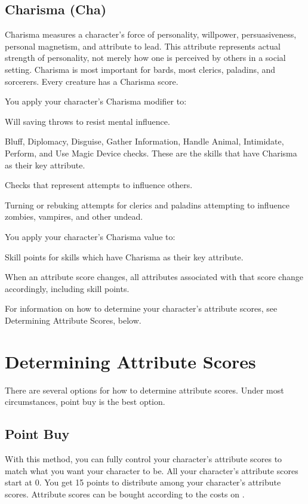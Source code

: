 \subsection{Charisma (Cha)}
Charisma measures a character's force of personality, willpower, persuasiveness, personal magnetism, and attribute to lead. This attribute represents actual strength of personality, not merely how one is perceived by others in a social setting. Charisma is most important for bards, most clerics, paladins, and sorcerers. Every creature has a Charisma score.

You apply your character's Charisma modifier to:
\begin{itemize*}
\item Will saving throws to resist mental influence.
\item Bluff, Diplomacy, Disguise, Gather Information, Handle Animal, Intimidate, Perform, and Use Magic Device checks. These are the skills that have Charisma as their key attribute.
\item Checks that represent attempts to influence others.
\item Turning or rebuking attempts for clerics and paladins attempting to influence zombies, vampires, and other undead.
\end{itemize*}
You apply your character's Charisma value to:
\begin{itemize*}
\item Skill points for skills which have Charisma as their key attribute.
\end{itemize*}

When an attribute score changes, all attributes associated with that score change accordingly, including skill points.

For information on how to determine your character's attribute scores, see Determining Attribute Scores, below.

\section{Determining Attribute Scores}
There are several options for how to determine attribute scores. Under most circumstances, point buy is the best option.

\subsection{Point Buy}
With this method, you can fully control your character's attribute scores to match what you want your character to be. All your character's attribute scores start at 0. You get 15 points to distribute among your character's attribute scores. Attribute scores can be bought according to the costs on .

